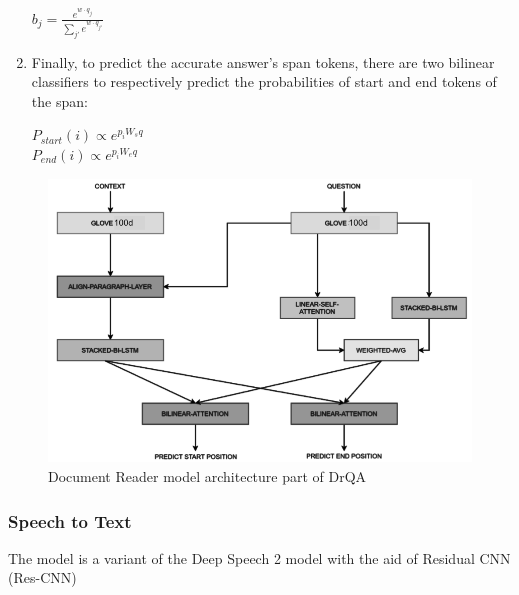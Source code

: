 \begin{enumerate}[start=1,label={\bfseries\arabic*:}]
    \begin{center} 
    $b_j = \frac{e^{w \cdot q_j}}{\sum_{j'}e^{w\cdot q_{j'}}}$
    \end{center}
        \vspace{5pt}

    \item Finally, to predict the accurate answer's span tokens, there are two bilinear classifiers to respectively predict the probabilities of start and end tokens of the span: 
        \vspace{5pt}

    \begin{center} 
    $P_{start}(i) \propto e^{p_iW_sq}$ \\
    $P_{end}(i) \propto e^{p_iW_eq}$
    \end{center}
    
    
\end{enumerate}


\begin{figure}[!t]
    \centering
    \includegraphics[width=\linewidth]{img/DrQA.png}
    \caption{Document Reader model architecture part of DrQA \cite{DrQA, drqa_architecture}}
    \label{fig:DrQA}
\end{figure}





\subsubsection{Speech to Text}

The model is a variant of the Deep Speech 2 model with the aid of Residual CNN (Res-CNN)

